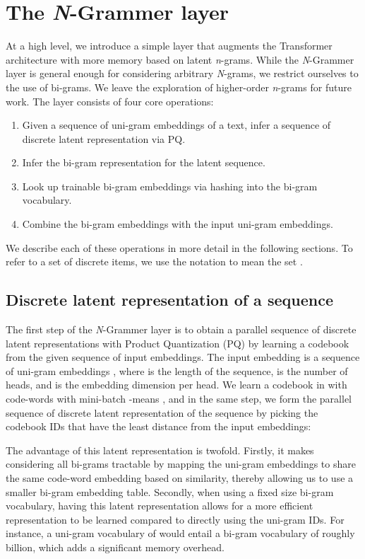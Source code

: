 \documentclass[11pt]{article}
\begin{document}
\section{The \textit{N}-Grammer layer}
At a high level, we introduce a simple layer that augments the Transformer architecture with more memory based on latent \textit{n}-grams. While the \textit{N}-Grammer layer is general enough for
considering arbitrary \textit{N}-grams, 
we restrict ourselves to the use of bi-grams. 
We leave the exploration of higher-order \textit{n}-grams for future work.
The layer consists of four core operations: 
\begin{enumerate}
\item Given a sequence of uni-gram embeddings of a text, infer 
a sequence of 
discrete latent representation via PQ. 

\item Infer the bi-gram representation for the latent sequence.

\item Look up trainable bi-gram embeddings via hashing into the bi-gram vocabulary.

\item Combine the bi-gram embeddings with the input uni-gram embeddings.
\end{enumerate}
We describe each of these operations in more detail in the following sections.
To refer to a set of discrete items, we use the notation 
 to mean the set .

\subsection{Discrete latent representation of a sequence}\label{sec:vq}
The first step of the \textit{N}-Grammer layer is to obtain a parallel sequence of discrete latent
representations with Product Quantization (PQ) \citep{jegou2011product} by learning a codebook from the given sequence of input embeddings. The input embedding is a sequence of uni-gram 
embeddings , 
where  is the length of the sequence,  is the number of heads, and  is the embedding dimension per head. We learn a codebook  in  with  code-words with 
mini-batch -means \citep{bottou1995convergence}, and in the same step, we form the parallel sequence of 
discrete latent representation  of the sequence  by picking the codebook IDs 
that have the least distance from the input embeddings:
 
The advantage of this latent representation  is twofold. Firstly, it makes considering all  
bi-grams tractable by mapping the uni-gram embeddings to share the same code-word embedding based on 
similarity, thereby allowing us to use a smaller bi-gram embedding table. 
Secondly, when using a fixed size bi-gram vocabulary, having this latent 
representation allows for a more efficient representation to be learned
compared to directly using the uni-gram IDs. For instance, a uni-gram 
vocabulary of  would entail a bi-gram vocabulary of roughly 
 billion, which adds a significant memory overhead. 
\end{document}
